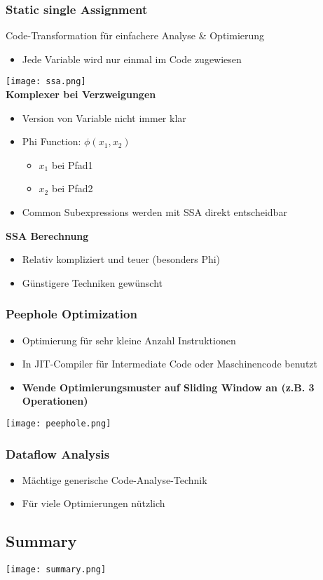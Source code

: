 \subsubsection{Static single Assignment}
Code-Transformation für einfachere Analyse \& Optimierung
\begin{itemize}
    \item Jede Variable wird nur einmal im Code zugewiesen
\end{itemize}
\texttt{[image: ssa.png]}\\ 
\textbf{Komplexer bei Verzweigungen}
\begin{itemize}
    \item Version von Variable nicht immer klar
    \item Phi Function: $\phi (x_1, x_2)$
    \begin{itemize}
        \item $x_1$ bei Pfad1
        \item $x_2$ bei Pfad2
    \end{itemize}
    \item Common Subexpressions werden mit SSA direkt entscheidbar
\end{itemize}
\textbf{SSA Berechnung}
\begin{itemize}
    \item Relativ kompliziert und teuer (besonders Phi)
    \item Günstigere Techniken gewünscht
\end{itemize}

 \subsubsection{Peephole Optimization}
 \begin{itemize}
     \item Optimierung für sehr kleine Anzahl Instruktionen
     \item In JIT-Compiler für Intermediate Code oder Maschinencode benutzt
     \item \textbf{Wende Optimierungsmuster auf Sliding Window an (z.B. 3 Operationen)}
 \end{itemize}
\texttt{[image: peephole.png]}

\subsubsection{Dataflow Analysis}
\begin{itemize}
    \item Mächtige generische Code-Analyse-Technik
    \item Für viele Optimierungen nützlich
\end{itemize}

\subsection{Summary}
\texttt{[image: summary.png]}
